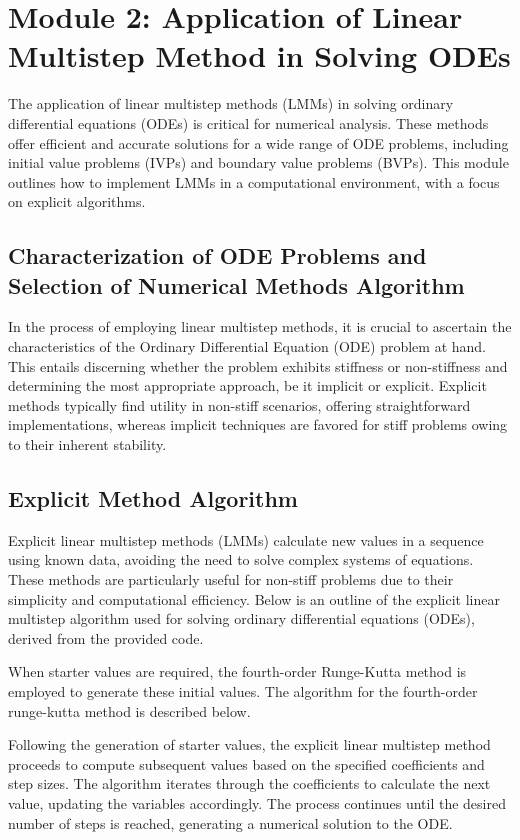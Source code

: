 \documentclass[a4paper, twoside]{report} %
\begin{document}
	\section{Module 2: Application of Linear Multistep Method in Solving ODEs}

	The application of linear multistep methods (LMMs) in solving ordinary differential equations (ODEs) is critical for numerical analysis. These methods offer efficient and accurate solutions for a wide range of ODE problems, including initial value problems (IVPs) and boundary value problems (BVPs). This module outlines how to implement LMMs in a computational environment, with a focus on explicit algorithms.

	\subsection*{Characterization of ODE Problems and Selection of Numerical Methods Algorithm}
	In the process of employing linear multistep methods, it is crucial to ascertain the characteristics of the Ordinary Differential Equation (ODE) problem at hand. This entails discerning whether the problem exhibits stiffness or non-stiffness and determining the most appropriate approach, be it implicit or explicit. Explicit methods typically find utility in non-stiff scenarios, offering straightforward implementations, whereas implicit techniques are favored for stiff problems owing to their inherent stability.


	\subsection{Explicit Method Algorithm}
	Explicit linear multistep methods (LMMs) calculate new values in a sequence using known data, avoiding the need to solve complex systems of equations. These methods are particularly useful for non-stiff problems due to their simplicity and computational efficiency. Below is an outline of the explicit linear multistep algorithm used for solving ordinary differential equations (ODEs), derived from the provided code.

	When starter values are required, the fourth-order Runge-Kutta method is employed to generate these initial values. The algorithm for the fourth-order runge-kutta method is described below.

	Following the generation of starter values, the explicit linear multistep method proceeds to compute subsequent values based on the specified coefficients and step sizes. The algorithm iterates through the coefficients to calculate the next value, updating the variables accordingly. The process continues until the desired number of steps is reached, generating a numerical solution to the ODE.
\end{document}
